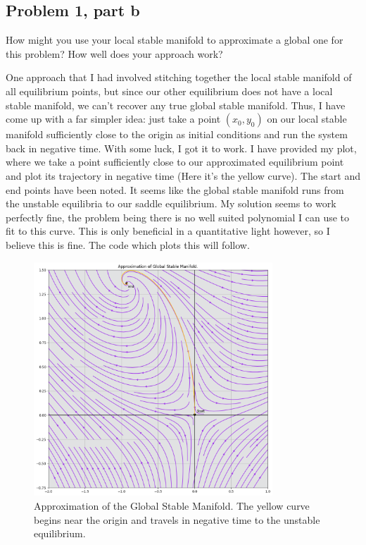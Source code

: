 \begin{solution}
\clearpage

\end{solution}

\newpage
\subsection{Problem 1, part b}
How might you use your local stable manifold to approximate a global one for this problem? How well does your approach work?
\partbreak
\begin{solution}

    One approach that I had involved stitching together the local stable manifold of all equilibrium points, but since our other equilibrium does not have a local stable manifold, we can't recover any true global stable manifold. Thus, I have come up with a far simpler idea: just take a point $(x_0, y_0)$ on our local stable manifold sufficiently close to the origin as initial conditions and run the system back in negative time. With some luck, I got it to work. I have provided my plot, where we take a point sufficiently close to our approximated equilibrium point and plot its trajectory in negative time (Here it's the yellow curve). The start and end points have been noted. It seems like the global stable manifold runs from the unstable equilibria to our saddle equilibrium. My solution seems to work perfectly fine, the problem being there is no well suited polynomial I can use to fit to this curve. This is only beneficial in a quantitative light however, so I believe this is fine. The code which plots this will follow. 

    \begin{figure}[ht]
        \centering
        \includegraphics[width = 0.8\textwidth]{Images/Global Stable Manifold.png}
        \caption{Approximation of the Global Stable Manifold. The yellow curve begins near the origin and travels in negative time to the unstable equilibrium.}
        \label{fig:p1b GSM}
    \end{figure}

    \clearpage

\end{solution}

